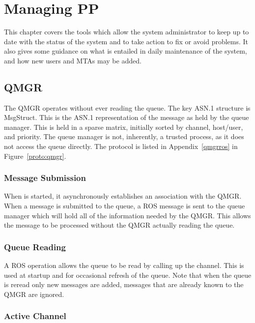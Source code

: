 \chapter {Managing PP}

This chapter covers the
tools which allow the system administrator to keep up to date
with the status of the system and to take action to fix or avoid problems.
It also gives some guidance on what is entailed in daily maintenance of 
the system, and how new users and MTAs may be added. 

\section{QMGR}

The QMGR operates without ever reading the queue.  The key ASN.1
structure is MsgStruct.  This is the ASN.1 representation of the
message as held by the queue manager.  This is held in a sparse
matrix, initially sorted by channel, host/user, and priority.  The
queue manager is not, inherently, a trusted process, as it does not
access the queue directly. The protocol is listed in
Appendix~\ref{qmgrros} in Figure~\ref{proto:qmgr}.

\subsection{Message Submission}

When  is started, it asynchronously establishes an association
with the QMGR.  When a message is submitted to the queue, a ROS
message is sent to the queue manager which will hold all of the
information needed by the QMGR.  This allows the message to be
processed without the QMGR actually reading the queue.

\subsection{Queue Reading}

A ROS operation allows the queue to be read by calling up the
 channel.  This is used at startup and for occasional
refresh of the queue. Note that when the queue is reread only new
messages are added, messages that are already known to the QMGR are ignored.

\subsection{Active Channel}

